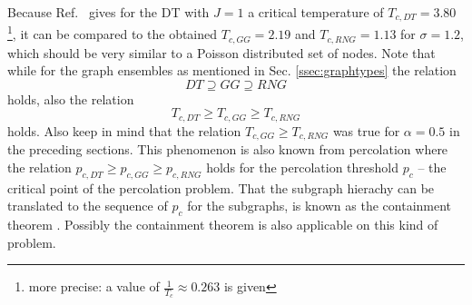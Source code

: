         Because Ref.\ \cite{Janke1994} gives for the DT with \(J=1\) a
        critical temperature of \(T_{c,DT} = 3.80\)\footnote{more precise: a value of \(\frac{1}{T_c} \approx 0.263\) is given},
        it can be compared to the obtained \(T_{c,GG} = 2.19\)
        and \(T_{c,RNG} = 1.13\) for \(\sigma = 1.2\), which should be very
        similar to a Poisson distributed set of nodes.
        Note that while for the graph ensembles as mentioned in Sec. \ref{ssec:graphtypes}
        the relation
        \begin{equation}
            DT \supseteq GG \supseteq RNG
        \end{equation}
        holds, also the
        relation
        \begin{equation}
            T_{c,DT} \ge T_{c,GG} \ge T_{c,RNG}
        \end{equation}
        holds.
        Also keep in mind that the relation \(T_{c,GG} \ge T_{c,RNG}\)
        was true for \(\alpha = 0.5\) in the preceding sections.
        This phenomenon is also known from percolation where the relation
        \(p_{c,DT} \ge p_{c,GG} \ge p_{c,RNG}\) holds for the percolation
        threshold \(p_c\) -- the critical point of the percolation problem.
        That the subgraph hierachy can be translated to
        the sequence of \(p_c\) for the subgraphs, is known as the containment
        theorem \cite{fisher}.
        Possibly the containment theorem is also applicable on this kind of
        problem.

